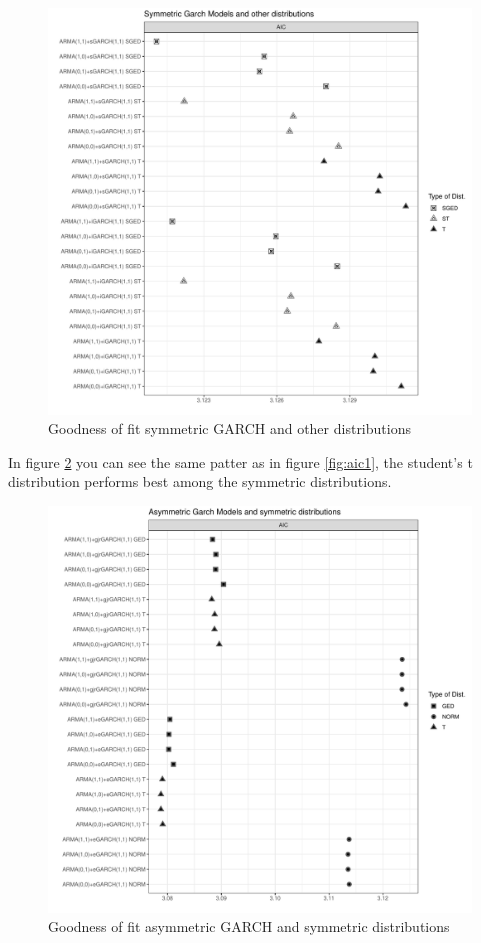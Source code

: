 \documentclass[a4paper, nobind]{templates/ociamthesis}
\begin{document}
\begin{figure}[h]

{\centering \includegraphics[width=0.9\linewidth]{figures/aicfigures/symmetric aics2} 

}

\caption{Goodness of fit symmetric GARCH and other distributions}\label{fig:aic2}
\end{figure}
\clearpage
\newpage

\noindent In figure \ref{fig:aic3} you can see the same patter as in figure \ref{fig:aic1}, the student's t distribution performs best among the symmetric distributions.

\begin{figure}[h]

{\centering \includegraphics[width=0.9\linewidth]{figures/aicfigures/asymmetric aics} 

}

\caption{Goodness of fit asymmetric GARCH and symmetric distributions}\label{fig:aic3}
\end{figure}
\newpage
\clearpage
\end{document}
